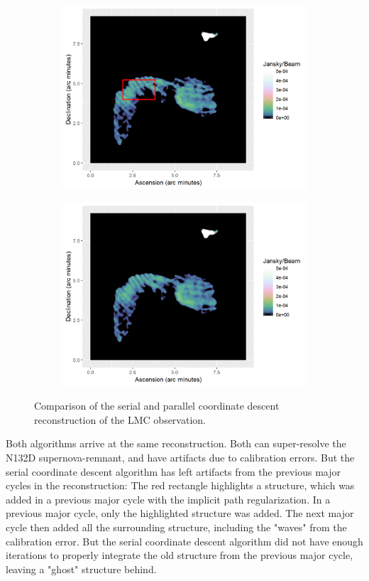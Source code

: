 \begin{figure}[h]
\begin{subfigure}{0.45\linewidth}
		\includegraphics[width=1.0\linewidth]{./chapters/05.pcdm/comparison/SerialCD-Calibration2.png}
	\end{subfigure}
	\begin{subfigure}{0.45\linewidth}
		\centering
		\includegraphics[width=1.0\linewidth]{./chapters/05.pcdm/comparison/PCDM-Calibration.png}
	\end{subfigure}
	
	\caption{Comparison of the serial and parallel coordinate descent reconstruction of the LMC observation.}
	\label{pcdm:comparison:figure}
\end{figure}

Both algorithms arrive at the same reconstruction. Both can super-resolve the N132D supernova-remnant, and have artifacts due to calibration errors. But the serial coordinate descent algorithm has left artifacts from the previous major cycles in the reconstruction: The red rectangle highlights a structure, which was added in a previous major cycle with the implicit path regularization. In a previous major cycle, only the highlighted structure was added. The next major cycle then added all the surrounding structure, including the "waves" from the calibration error. But the serial coordinate descent algorithm did not have enough iterations to properly integrate the old structure from the previous major cycle, leaving a "ghost" structure behind.

